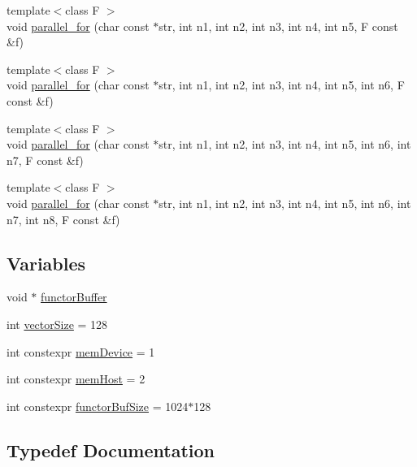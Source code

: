 \begin{DoxyCompactItemize}
\item 
{\footnotesize template$<$class F $>$ }\\void \hyperlink{namespaceyakl_ab83fda59ab02bb8c21be357843e79bf6}{parallel\+\_\+for} (char const $\ast$str, int n1, int n2, int n3, int n4, int n5, F const \&f)
\item 
{\footnotesize template$<$class F $>$ }\\void \hyperlink{namespaceyakl_a2632b4726d73fe995e7cd7c287881379}{parallel\+\_\+for} (char const $\ast$str, int n1, int n2, int n3, int n4, int n5, int n6, F const \&f)
\item 
{\footnotesize template$<$class F $>$ }\\void \hyperlink{namespaceyakl_af826c667f5b2fbb643adb2c410cc1ef1}{parallel\+\_\+for} (char const $\ast$str, int n1, int n2, int n3, int n4, int n5, int n6, int n7, F const \&f)
\item 
{\footnotesize template$<$class F $>$ }\\void \hyperlink{namespaceyakl_a682ed571a33d1b0f00e6edbc2e1e7329}{parallel\+\_\+for} (char const $\ast$str, int n1, int n2, int n3, int n4, int n5, int n6, int n7, int n8, F const \&f)
\end{DoxyCompactItemize}
\subsection*{Variables}
\begin{DoxyCompactItemize}
\item 
void $\ast$ \hyperlink{namespaceyakl_a1494e7173b6c6f4c68eb55b6f70a521f}{functor\+Buffer}
\item 
int \hyperlink{namespaceyakl_a1ba339b7ce3e6f518d91ddba175c16d8}{vector\+Size} = 128
\item 
int constexpr \hyperlink{namespaceyakl_ac3c32aec58c61e7f870081477ceee883}{mem\+Device} = 1
\item 
int constexpr \hyperlink{namespaceyakl_aae8a8c910fec7cef7db68c9658c16405}{mem\+Host} = 2
\item 
int constexpr \hyperlink{namespaceyakl_a01bfd5e27f299747a137fd7f60c2bc17}{functor\+Buf\+Size} = 1024$\ast$128
\end{DoxyCompactItemize}


\subsection{Typedef Documentation}
\mbox{\label{namespaceyakl_ad77ef6d92b742f4415930d8a33321ac7}} 
